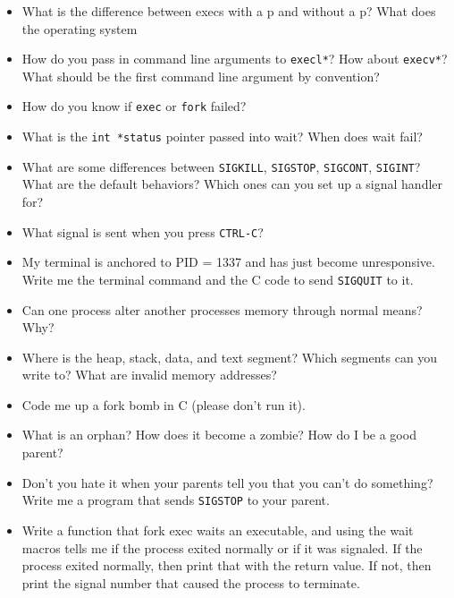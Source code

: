 \begin{itemize}
\tightlist
\item
  What is the difference between execs with a p and without a p? What
  does the operating system
\item
  How do you pass in command line arguments to \texttt{execl*}? How
  about \texttt{execv*}? What should be the first command line argument
  by convention?
\item
  How do you know if \texttt{exec} or \texttt{fork} failed?
\item
  What is the \texttt{int\ *status} pointer passed into wait? When does
  wait fail?
\item
  What are some differences between \texttt{SIGKILL}, \texttt{SIGSTOP},
  \texttt{SIGCONT}, \texttt{SIGINT}? What are the default behaviors?
  Which ones can you set up a signal handler for?
\item
  What signal is sent when you press \texttt{CTRL-C}?
\item
  My terminal is anchored to PID = 1337 and has just become
  unresponsive. Write me the terminal command and the C code to send
  \texttt{SIGQUIT} to it.
\item
  Can one process alter another processes memory through normal means?
  Why?
\item
  Where is the heap, stack, data, and text segment? Which segments can
  you write to? What are invalid memory addresses?
\item
  Code me up a fork bomb in C (please don't run it).
\item
  What is an orphan? How does it become a zombie? How do I be a good
  parent?
\item
  Don't you hate it when your parents tell you that you can't do
  something? Write me a program that sends \texttt{SIGSTOP} to your
  parent.
\item
  Write a function that fork exec waits an executable, and using the
  wait macros tells me if the process exited normally or if it was
  signaled. If the process exited normally, then print that with the
  return value. If not, then print the signal number that caused the
  process to terminate.
\end{itemize}
